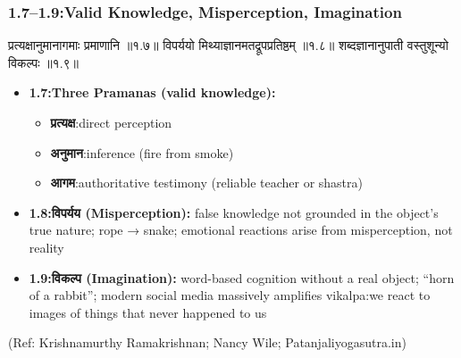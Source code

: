 \begin{frame}[fragile]\frametitle{1.7–1.9:Valid Knowledge, Misperception, Imagination}

\begin{sanskrit}
प्रत्यक्षानुमानागमाः प्रमाणानि ॥१.७॥
विपर्ययो मिथ्याज्ञानमतद्रूपप्रतिष्ठम् ॥१.८॥
शब्दज्ञानानुपाती वस्तुशून्यो विकल्पः ॥१.९॥
\end{sanskrit}

\begin{itemize}
\item \textbf{1.7:Three Pramanas (valid knowledge):}
    \begin{itemize}
    \item \textbf{प्रत्यक्ष}:direct perception
    \item \textbf{अनुमान}:inference (fire from smoke)
    \item \textbf{आगम}:authoritative testimony (reliable teacher or shastra)
    \end{itemize}
\item \textbf{1.8:विपर्यय (Misperception):} false knowledge not grounded in the object's true nature; rope → snake; emotional reactions arise from misperception, not reality
\item \textbf{1.9:विकल्प (Imagination):} word-based cognition without a real object; ``horn of a rabbit''; modern social media massively amplifies vikalpa:we react to images of things that never happened to us
\end{itemize}

\tiny{(Ref: Krishnamurthy Ramakrishnan; Nancy Wile; Patanjaliyogasutra.in)}

\end{frame}

